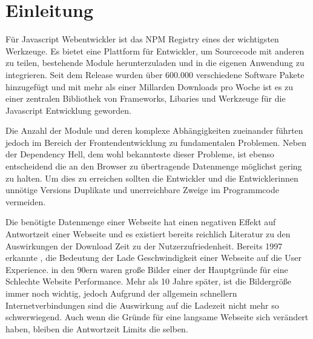 
\section{Einleitung}

Für Javascript Webentwickler ist das NPM Registry eines der wichtigsten Werkzeuge. Es bietet eine Plattform für Entwickler, um Sourcecode mit anderen zu teilen, bestehende Module herunterzuladen und in die eigenen Anwendung zu integrieren. Seit dem Release wurden über 600.000 verschiedene Software Pakete hinzugefügt und mit mehr als einer Millarden Downloads pro Woche ist es zu einer zentralen Bibliothek von Frameworks, Libaries und Werkzeuge für die Javascript Entwicklung geworden. \autocite{Npmdocs}

Die Anzahl der Module und deren komplexe Abhängigkeiten zueinander führten jedoch im Bereich der Frontendentwicklung zu fundamentalen Problemen. Neben der Dependency Hell, dem wohl bekannteste dieser Probleme, ist ebenso entscheidend die an den Browser zu übertragende Datenmenge möglichst gering zu halten. Um dies zu erreichen sollten die Entwickler und die Entwicklerinnen unnötige Versions Duplikate und unerreichbare Zweige im Programmcode vermeiden.\autocite{DominikWilkowski}

Die benötigte Datenmenge einer Webseite hat einen negativen Effekt auf Antwortzeit einer Webseite und es existiert bereits reichlich Literatur zu den Auswirkungen der Download Zeit zu der Nutzerzufriedenheit. Bereits 1997 erkannte \textcite{Nielson1997}, die Bedeutung der Lade Geschwindigkeit einer Webseite auf die User Experience. in den 90ern waren große Bilder einer der Hauptgründe für eine Schlechte Website Performance. Mehr als 10 Jahre später, ist die Bildergröße immer noch wichtig, jedoch Aufgrund der allgemein schnellern Internetverbindungen sind die Auswirkung auf die Ladezeit nicht mehr so schwerwiegend. Auch wenn die Gründe für eine langsame Webseite sich verändert haben, bleiben die Antwortzeit Limits die selben. \autocite{Nielson2010}

